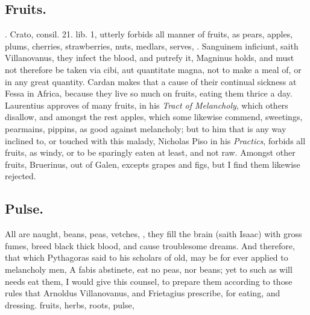 {{\subsection{Fruits.}
. Crato, consil. 21.
lib. 1, utterly forbids all manner of fruits, as pears, apples, plums,
cherries, strawberries, nuts, medlars, serves, \etc{}. Sanguinem inficiunt,
saith Villanovanus, they infect the blood, and putrefy it, Magninus
holds, and must not therefore be taken via cibi, aut quantitate magna,
not to make a meal of, or in any great quantity. Cardan makes
that a cause of their continual sickness at Fessa in Africa, because
they live so much on fruits, eating them thrice a day. Laurentius
approves of many fruits, in his \emph{Tract of Melancholy}, which others
disallow, and amongst the rest apples, which some likewise commend,
sweetings, pearmains, pippins, as good against melancholy; but to him
that is any way inclined to, or touched with this malady,
Nicholas Piso in his \emph{Practics}, forbids all fruits, as windy, or
to be sparingly eaten at least, and not raw. Amongst other fruits,
Bruerinus, out of Galen, excepts grapes and figs, but I find them
likewise rejected.
\subsection{Pulse.}
All  are naught, beans, peas, vetches, \etc{}, they fill
the brain (saith Isaac) with gross fumes, breed black thick blood, and
cause troublesome dreams. And therefore, that which Pythagoras said to
his scholars of old, may be for ever applied to melancholy men, A fabis
abstinete, eat no peas, nor beans; yet to such as will needs eat them,
I would give this counsel, to prepare them according to those rules
that Arnoldus Villanovanus, and Frietagius prescribe, for eating, and
dressing. fruits, herbs, roots, pulse, \etc{}

}}
